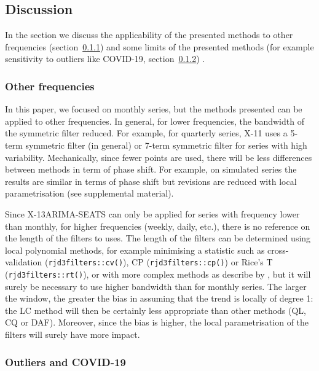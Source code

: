 \documentclass[
]{article}
\newcommand\1{\mathds{1}}
\begin{document}
\subsection{Discussion}\label{discussion}

In the section we discuss the applicability of the presented methods to
other frequencies (section~\ref{sec-other-freq}) and some limits of the
presented methods (for example sensitivity to outliers like COVID-19,
section~\ref{sec-out-covid}) .

\subsubsection{Other frequencies}\label{sec-other-freq}

In this paper, we focused on monthly series, but the methods presented
can be applied to other frequencies. In general, for lower frequencies,
the bandwidth of the symmetric filter reduced. For example, for
quarterly series, X-11 uses a 5-term symmetric filter (in general) or
7-term symmetric filter for series with high variability. Mechanically,
since fewer points are used, there will be less differences between
methods in term of phase shift. For example, on simulated series the
results are similar in terms of phase shift but revisions are reduced
with local parametrisation (see supplemental material).

Since X-13ARIMA-SEATS can only be applied for series with frequency
lower than monthly, for higher frequencies (weekly, daily, etc.), there
is no reference on the length of the filters to uses. The length of the
filters can be determined using local polynomial methods, for example
minimising a statistic such as cross-validation
(\texttt{rjd3filters::cv()}), CP (\texttt{rjd3filters::cp()}) or Rice's
T (\texttt{rjd3filters::rt()}), or with more complex methods as describe
by \textcite{Loader1999}, but it will surely be necessary to use higher
bandwidth than for monthly series. The larger the window, the greater
the bias in assuming that the trend is locally of degree 1: the LC
method will then be certainly less appropriate than other methods (QL,
CQ or DAF). Moreover, since the bias is higher, the local
parametrisation of the filters will surely have more impact.

\subsubsection{Outliers and COVID-19}\label{sec-out-covid}
\end{document}
